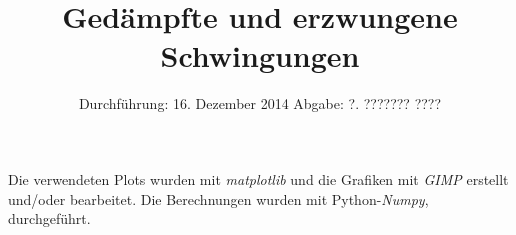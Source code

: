 
\usepackage{marvosym}
\subject{Anfängerpraktikum V354}
\title{Gedämpfte und erzwungene Schwingungen
}
\date{
  Durchführung: 16. Dezember 2014
  \hspace{1em}
  Abgabe: ?. ??????? ????
}


\maketitle
\thispagestyle{empty}
\newpage





\printbibliography
\noindent Die verwendeten Plots wurden mit \textit{matplotlib}\cite{matplotlib} und die Grafiken mit \textit{GIMP}\cite{gimp} erstellt und/oder bearbeitet.
Die Berechnungen wurden mit Python-\textit{Numpy}, \cite{numpy} durchgeführt.

